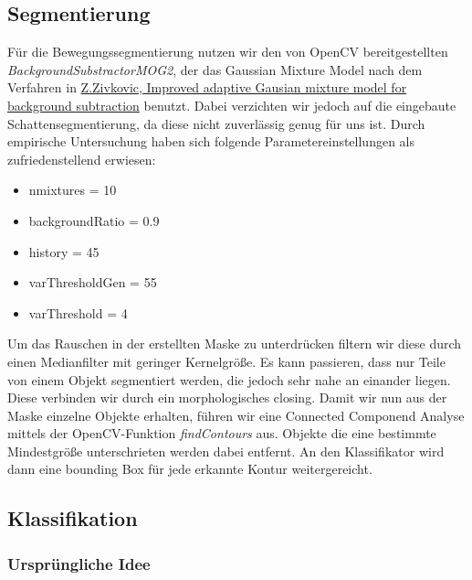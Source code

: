 \documentclass[conference]{IEEEtran}
\begin{document}
\subsection{Segmentierung }
Für die Bewegungssegmentierung nutzen wir den von OpenCV bereitgestellten \textit{BackgroundSubstractorMOG2}, der das Gaussian Mixture Model nach dem Verfahren in \ul{Z.Zivkovic, Improved adaptive Gausian mixture model for background subtraction} benutzt. Dabei verzichten wir jedoch auf die eingebaute Schattensegmentierung, da diese nicht zuverlässig genug für uns ist. Durch empirische Untersuchung haben sich folgende Parametereinstellungen als zufriedenstellend erwiesen:
\begin{itemize}
	\item nmixtures = 10
	\item backgroundRatio = 0.9
	\item history = 45
	\item varThresholdGen = 55
	\item varThreshold = 4
\end{itemize}
Um das Rauschen in der erstellten Maske zu unterdrücken filtern wir diese durch einen Medianfilter mit geringer Kernelgröße. Es kann passieren, dass nur Teile von einem Objekt segmentiert werden, die jedoch sehr nahe an einander liegen. Diese verbinden wir durch ein morphologisches closing.
Damit wir nun aus der Maske einzelne Objekte erhalten, führen wir eine Connected Componend Analyse mittels der OpenCV-Funktion \textit{findContours} aus. Objekte die eine bestimmte Mindestgröße unterschrieten werden dabei entfernt. An den Klassifikator wird dann eine bounding Box für jede erkannte Kontur weitergereicht.

\subsection{Klassifikation}

\subsubsection{Ursprüngliche Idee}
\end{document}
